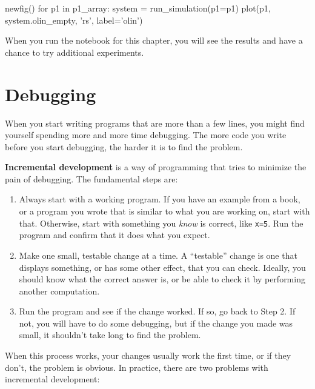 \documentclass[12pt]{book}
\theoremstyle{exercise}
\begin{document}
\begin{python}
newfig()
for p1 in p1_array:
    system = run_simulation(p1=p1)
    plot(p1, system.olin_empty, 'rs', label='olin')
\end{python}

When you run the notebook for this chapter, you will see the results and have a chance to try additional experiments.


\section{Debugging}

When you start writing programs that are more than a few lines, you
might find yourself spending more and more time debugging.  The more
code you write before you start debugging, the harder it is to find
the problem.

{\bf Incremental development} is a way of programming that tries
to minimize the pain of debugging.  The fundamental steps are:

\begin{enumerate}

\item Always start with a working program.  If you have an
example from a book, or a program you wrote that is similar to
what you are working on, start with that.  Otherwise, start with
something you {\em know} is correct, like {\tt x=5}.  Run the program
and confirm that it does what you expect.

\item Make one small, testable change at a time.  A ``testable''
change is one that displays something, or has some
other effect, that you can check.  Ideally, you should know what
the correct answer is, or be able to check it by performing another
computation. 

\item Run the program and see if the change worked.  If so, go back
to Step 2.  If not, you will have to do some debugging, but if the
change you made was small, it shouldn't take long to find the problem.

\end{enumerate}

When this process works, your changes usually work the first time, or if they don't, the problem is obvious.  In practice, there are two problems with incremental development:
\end{document}
